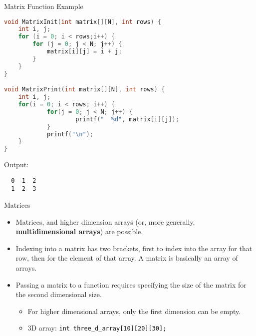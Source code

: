 \documentclass[graphics]{beamer}
\begin{document}
\begin{frame}[fragile]{Matrix Function Example}
    \begin{lstlisting}[language=C,basicstyle=\scriptsize,keywordstyle=\color{blue},commentstyle=\color{green},showstringspaces=false,stringstyle=\color{red}]
void MatrixInit(int matrix[][N], int rows) {
    int i, j;
    for (i = 0; i < rows;i++) {
        for (j = 0; j < N; j++) {
            matrix[i][j] = i + j;
        }
    }
}

void MatrixPrint(int matrix[][N], int rows) {
    int i, j;
    for(i = 0; i < rows; i++) {
            for(j = 0; j < N; j++) {
                    printf("  %d", matrix[i][j]);
            }
            printf("\n");
    }
}
    \end{lstlisting}
    Output:
    \scriptsize
    \begin{verbatim}
  0  1  2
  1  2  3
    \end{verbatim}
\end{frame}

\begin{frame}{Matrices}
    \begin{itemize}
        \item Matrices, and higher dimension arrays (or, more generally, \textbf{multidimensional arrays}) are possible.
        \item Indexing into a matrix has two brackets, first to index into the array for that row, then for the element of that array. A matrix is basically an array of arrays.
        \item Passing a matrix to a function requires specifying the size of the matrix for the second dimensional size.
        \begin{itemize}
            \item For higher dimensional arrays, only the first dimension can be empty.
            \item 3D array: \texttt{int three\_d\_array[10][20][30];}
        \end{itemize}
    \end{itemize}
\end{frame}
\end{document}
